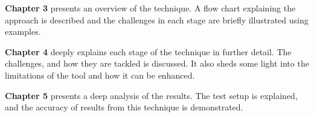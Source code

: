 \textbf{Chapter 3} presents an overview of the technique. A flow chart explaining the approach is described and the challenges in each stage are briefly illustrated using examples.

\textbf{Chapter 4} deeply explains each stage of the technique in further detail. The challenges, and how they are tackled is discussed. It also sheds some light into the limitations of the tool and how it can be enhanced.

\textbf{Chapter 5} presents a deep analysis of the results. The test setup is explained, and the accuracy of results from this technique is demonstrated.